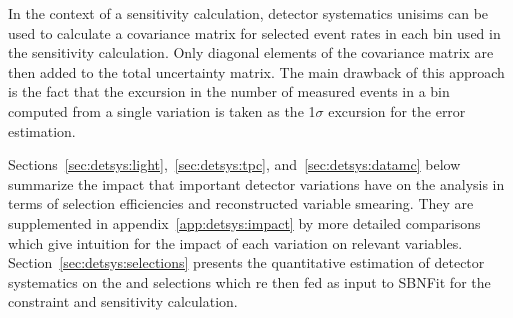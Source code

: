 \par In the context of a sensitivity calculation, detector systematics unisims can be used to calculate a covariance matrix for selected event rates in each bin used in the sensitivity calculation. Only diagonal elements of the covariance matrix are then added to the total uncertainty matrix. 
The main drawback of this approach is the fact that the excursion in the number of measured events in a bin computed from a single variation is taken as the 1$\sigma$ excursion for the error estimation.
\par Sections~\ref{sec:detsys:light},~\ref{sec:detsys:tpc}, and~\ref{sec:detsys:datamc} below summarize the impact that important detector variations have on the analysis in terms of selection efficiencies and reconstructed variable smearing. They are supplemented in appendix~\ref{app:detsys:impact} by more detailed comparisons which give intuition for the impact of each variation on relevant variables. Section~\ref{sec:detsys:selections} presents the quantitative estimation of detector systematics on the \nue and \numu selections which re then fed as input to SBNFit for the constraint and sensitivity calculation.

